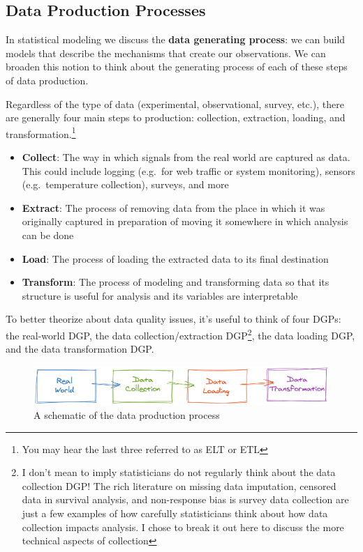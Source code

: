 \documentclass[
]{krantz}
\providecommand{\tightlist}{%
  \setlength{\itemsep}{0pt}\setlength{\parskip}{0pt}}
\begin{document}
\hypertarget{data-production-processes}{%
\subsection{Data Production Processes}\label{data-production-processes}}

In statistical modeling we discuss the \textbf{data generating process}: we can build models that describe the mechanisms that create our observations.
We can broaden this notion to think about the generating process of each of these steps of data production.

Regardless of the type of data (experimental, observational, survey, etc.), there are generally four main steps to production: collection, extraction, loading, and transformation.\footnote{You may hear the last three referred to as ELT or ETL}

\begin{itemize}
\tightlist
\item
  \textbf{Collect}: The way in which signals from the real world are captured as data. This could include logging (e.g.~for web traffic or system monitoring), sensors (e.g.~temperature collection), surveys, and more
\item
  \textbf{Extract}: The process of removing data from the place in which it was originally captured in preparation of moving it somewhere in which analysis can be done
\item
  \textbf{Load}: The process of loading the extracted data to its final destination
\item
  \textbf{Transform}: The process of modeling and transforming data so that its structure is useful for analysis and its variables are interpretable
\end{itemize}

To better theorize about data quality issues, it's useful to think of four DGPs: the real-world DGP, the data collection/extraction DGP\footnote{I don't mean to imply statisticians do not regularly think about the data collection DGP! The rich literature on missing data imputation, censored data in survival analysis, and non-response bias is survey data collection are just a few examples of how carefully statisticians think about how data collection impacts analysis. I chose to break it out here to discuss the more technical aspects of collection}, the data loading DGP, and the data transformation DGP.

\begin{figure}

{\centering \includegraphics[width=0.9\linewidth]{figures/data-dall/dgp} 

}

\caption{A schematic of the data production process}\label{fig:unnamed-chunk-2}
\end{figure}
\end{document}
